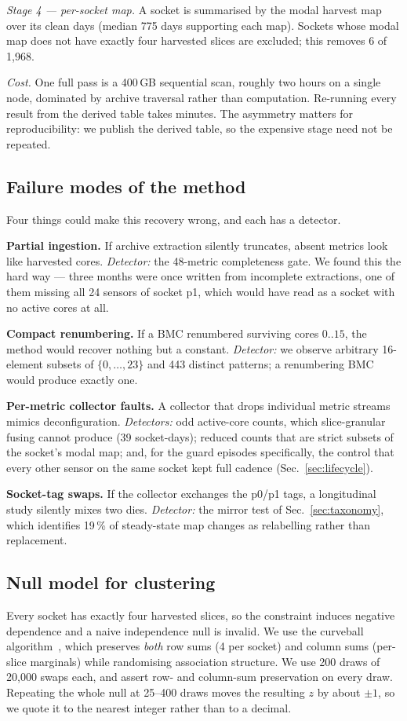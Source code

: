 \documentclass[10pt,conference]{IEEEtran}
\begin{document}
\emph{Stage 4 --- per-socket map.} A socket is summarised by the modal harvest map over its clean
days (median 775 days supporting each map). Sockets whose modal map does not have exactly four
harvested slices are excluded; this removes 6 of 1{,}968.

\emph{Cost.} One full pass is a 400\,GB sequential scan, roughly two hours on a single node,
dominated by archive traversal rather than computation. Re-running every result from the derived
table takes minutes. The asymmetry matters for reproducibility: we publish the derived table, so
the expensive stage need not be repeated.

\subsection{Failure modes of the method}
\label{sec:failure}
Four things could make this recovery wrong, and each has a detector.

\textbf{Partial ingestion.} If archive extraction silently truncates, absent metrics look like
harvested cores. \emph{Detector:} the 48-metric completeness gate. We found this the hard way ---
three months were once written from incomplete extractions, one of them missing all 24 sensors of
socket p1, which would have read as a socket with no active cores at all.

\textbf{Compact renumbering.} If a BMC renumbered surviving cores $0..15$, the method would
recover nothing but a constant. \emph{Detector:} we observe arbitrary 16-element subsets of
$\{0,\dots,23\}$ and 443 distinct patterns; a renumbering BMC would produce exactly one.

\textbf{Per-metric collector faults.} A collector that drops individual metric streams mimics
deconfiguration. \emph{Detectors:} odd active-core counts, which slice-granular fusing cannot
produce (39 socket-days); reduced counts that are strict subsets of the socket's modal map; and,
for the guard episodes specifically, the control that every other sensor on the same socket kept
full cadence (Sec.~\ref{sec:lifecycle}).

\textbf{Socket-tag swaps.} If the collector exchanges the p0/p1 tags, a longitudinal study
silently mixes two dies. \emph{Detector:} the mirror test of Sec.~\ref{sec:taxonomy}, which
identifies 19\,\% of steady-state map changes as relabelling rather than replacement.

\subsection{Null model for clustering}
\label{sec:null}
Every socket has exactly four harvested slices, so the constraint induces negative dependence and a
naive independence null is invalid. We use the curveball algorithm~\cite{strona2014curveball},
which preserves \emph{both} row sums (4 per socket) and column sums (per-slice marginals) while
randomising association structure. We use 200 draws of 20{,}000 swaps each, and assert row- and
column-sum preservation on every draw. Repeating the whole null at 25--400 draws moves the
resulting $z$ by about $\pm1$, so we quote it to the nearest integer rather than to a decimal.
\end{document}
